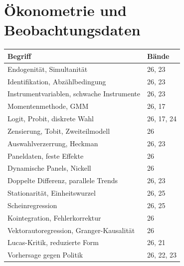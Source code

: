 \section*{Ökonometrie und Beobachtungsdaten}
\nopagebreak
{\small\renewcommand{\arraystretch}{1.32}
\begin{longtable}{@{}P{5.6cm}P{2.8cm}@{}}
\toprule
\textbf{Begriff} & \textbf{Bände}\\
\midrule
\endhead
Endogenität, Simultanität & 26, 23\\
Identifikation, Abzählbedingung & 26, 23\\
Instrumentvariablen, schwache Instrumente & 26, 23\\
Momentenmethode, GMM & 26, 17\\
Logit, Probit, diskrete Wahl & 26, 17, 24\\
Zensierung, Tobit, Zweiteilmodell & 26\\
Auswahlverzerrung, Heckman & 26, 23\\
Paneldaten, feste Effekte & 26\\
Dynamische Panels, Nickell & 26\\
Doppelte Differenz, parallele Trends & 26, 23\\
Stationarität, Einheitswurzel & 26, 25\\
Scheinregression & 26, 25\\
Kointegration, Fehlerkorrektur & 26\\
Vektorautoregression, Granger-Kausalität & 26\\
Lucas-Kritik, reduzierte Form & 26, 21\\
Vorhersage gegen Politik & 26, 22, 23\\
\bottomrule
\end{longtable}}


